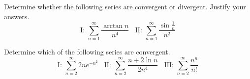 \documentclass{ximera}
\begin{document}
\begin{question}%

Determine whether the following series are convergent or divergent. Justify your answers.
\[ \text{I: } \sum_{n=1}^\infty \frac{\arctan n}{n^4} \ \ \ \ \text{II: } \sum_{n=1}^\infty \frac{\sin \frac{1}{n}}{n^2} \]
\begin{multiplechoice}
\end{multiplechoice}

\end{question}

\begin{question}%

Determine which of the following series are convergent. 
\[ \text{I: } \sum_{n=2}^\infty 2ne^{-n^2} \ \ \ \ \text{II: } \sum_{n=2}^\infty \frac{n + 2 \ln n}{2 n^4} \ \ \ \ \text{III: } \sum_{n=2}^\infty \frac{n^n}{n!} \]
\begin{multiplechoice}
\end{multiplechoice}

\end{question}
\end{document}
